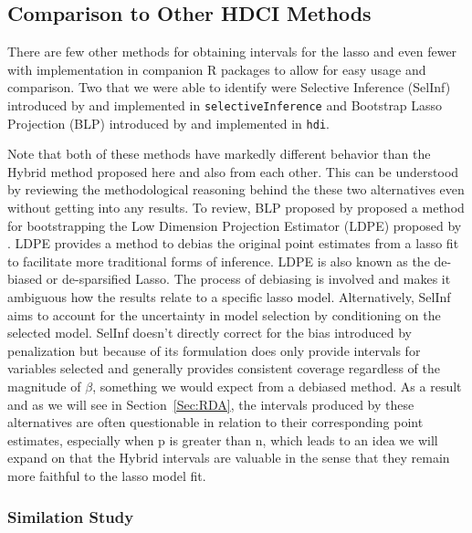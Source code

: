 \subsection{Comparison to Other HDCI Methods}\label{Sec:Comparison}

There are few other methods for obtaining intervals for the lasso and even fewer with implementation in companion R packages to allow for easy usage and comparison. Two that we were able to identify were Selective Inference (SelInf) introduced by \cite{LeeEtAl2016} and implemented in \texttt{selectiveInference} and Bootstrap Lasso Projection (BLP) introduced by \cite{Dezeure2017} and implemented in \texttt{hdi}.

Note that both of these methods have markedly different behavior than the Hybrid method proposed here and also from each other. This can be understood by reviewing the methodological reasoning behind the these two alternatives even without getting into any results. To review, BLP proposed by \cite{Dezeure2017} proposed a method for bootstrapping the Low Dimension Projection Estimator (LDPE) proposed by \cite{ZhangZhang2014}. LDPE provides a method to debias the original point estimates from a lasso fit to facilitate more traditional forms of inference. LDPE is also known as the de-biased or de-sparsified Lasso. The process of debiasing is involved and makes it ambiguous how the results relate to a specific lasso model. Alternatively, SelInf aims to account for the uncertainty in model selection by conditioning on the selected model. SelInf doesn't directly correct for the bias introduced by penalization but because of its formulation does only provide intervals for variables selected and generally provides consistent coverage regardless of the magnitude of $\beta$, something we would expect from a debiased method. As a result and as we will see in Section~\ref{Sec:RDA}, the intervals produced by these alternatives are often questionable in relation to their corresponding point estimates, especially when p is greater than n, which leads to an idea we will expand on that the Hybrid intervals are valuable in the sense that they remain more faithful to the lasso model fit.

\subsubsection{Similation Study}

